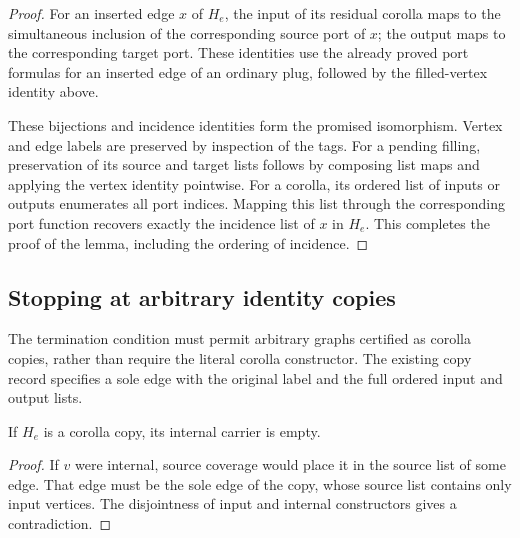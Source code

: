 \begin{proof}
For an inserted edge $x$ of $H_e$, the input of its residual corolla maps
to the simultaneous inclusion of the corresponding source port of $x$;
the output maps to the corresponding target port. These identities use
the already proved port formulas for an inserted edge of an ordinary plug,
followed by the filled-vertex identity above.

These bijections and incidence identities form the promised isomorphism.
Vertex and edge labels are preserved by inspection of the tags.
For a pending filling, preservation of its source and target lists follows
by composing list maps and applying the vertex identity pointwise.
For a corolla, its ordered list of inputs or outputs enumerates all port
indices. Mapping this list through the corresponding port function
recovers exactly the incidence list of $x$ in $H_e$.
This completes the proof of the lemma, including the ordering of incidence.
\end{proof}

\subsection{Stopping at arbitrary identity copies}
The termination condition must permit arbitrary graphs certified as
corolla copies, rather than require the literal corolla constructor.
The existing copy record specifies a sole edge with the original label
and the full ordered input and output lists.

\begin{lemma}
If $H_e$ is a corolla copy, its internal carrier is empty.
\end{lemma}
\begin{proof}
If $v$ were internal, source coverage would place it in the source list of
some edge. That edge must be the sole edge of the copy, whose source list
contains only input vertices. The disjointness of input and internal
constructors gives a contradiction.
\end{proof}


